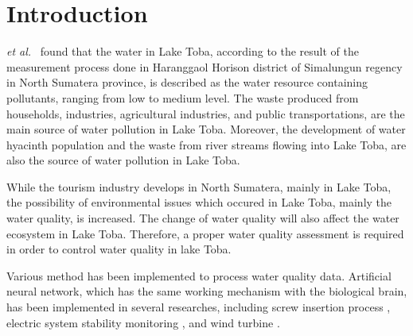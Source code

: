 \documentclass[journal,comsoc]{IEEEtran}
\begin{document}
%
\IEEEpeerreviewmaketitle



\section{Introduction}
% 
% 
% 
% 
 {\it et al.} \cite{Haro13} \ found that the water in Lake Toba, according to the result of the measurement process done in Haranggaol Horison district of Simalungun regency in North Sumatera province, is described as the water resource containing pollutants, ranging from low to medium level. The waste produced from households, industries, agricultural industries, and public transportations, are the main source of water pollution in Lake Toba. Moreover, the development of water hyacinth population and the waste from river streams flowing into Lake Toba, are also the source of water pollution in Lake Toba.

While the tourism industry develops in North Sumatera, mainly in Lake Toba, the possibility of environmental issues which occured in Lake Toba, mainly the water quality, is increased. The change of water quality will also affect the water ecosystem in Lake Toba. Therefore, a proper water quality assessment is required in order to control water quality in lake Toba.

Various method has been implemented to process water quality data. Artificial neural network, which has the same working mechanism with the biological brain, has been implemented in several researches, including screw insertion process \cite{Lara99}, electric system stability monitoring \cite{Popovic98}, and wind turbine \cite{Ata15}.
\end{document}
